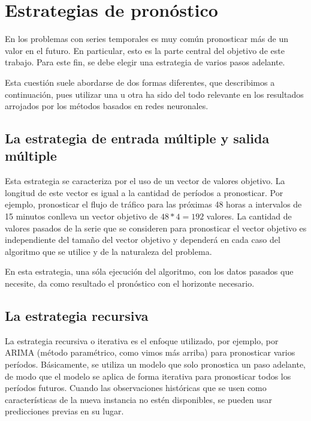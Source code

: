 \documentclass[]{book}
\begin{document}
\section{Estrategias de pronóstico}\label{estrategias-de-pronostico}

En los problemas con series temporales es muy común pronosticar más de
un valor en el futuro. En particular, esto es la parte central del
objetivo de este trabajo. Para este fin, se debe elegir una estrategia
de varios pasos adelante.

Esta cuestión suele abordarse de dos formas diferentes, que describimos
a continuación, pues utilizar una u otra ha sido del todo relevante en
los resultados arrojados por los métodos basados en redes neuronales.

\subsection{La estrategia de entrada múltiple y salida
múltiple}\label{la-estrategia-de-entrada-multiple-y-salida-multiple}

Esta estrategia se caracteriza por el uso de un vector de valores
objetivo. La longitud de este vector es igual a la cantidad de períodos
a pronosticar. Por ejemplo, pronosticar el flujo de tráfico para las
próximas 48 horas a intervalos de 15 minutos conlleva un vector objetivo
de \(48*4=192\) valores. La cantidad de valores pasados de la serie que
se consideren para pronosticar el vector objetivo es independiente del
tamaño del vector objetivo y dependerá en cada caso del algoritmo que se
utilice y de la naturaleza del problema.

En esta estrategia, una sóla ejecución del algoritmo, con los datos
pasados que necesite, da como resultado el pronóstico con el horizonte
necesario.

\subsection{La estrategia recursiva}\label{la-estrategia-recursiva}

La estrategia recursiva o iterativa es el enfoque utilizado, por
ejemplo, por ARIMA (método paramétrico, como vimos más arriba) para
pronosticar varios períodos. Básicamente, se utiliza un modelo que solo
pronostica un paso adelante, de modo que el modelo se aplica de forma
iterativa para pronosticar todos los períodos futuros. Cuando las
observaciones históricas que se usen como características de la nueva
instancia no estén disponibles, se pueden usar predicciones previas en
su lugar.
\end{document}
